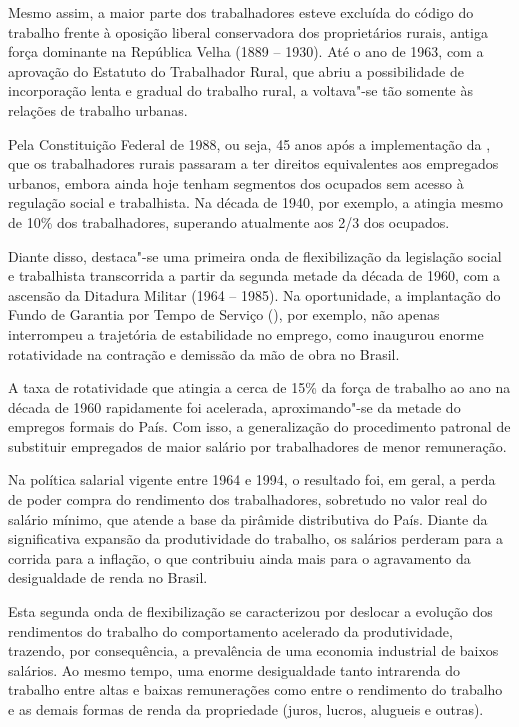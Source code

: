 Mesmo assim, a maior parte dos trabalhadores esteve excluída do código
do trabalho frente à oposição liberal conservadora dos proprietários
rurais, antiga força dominante na República Velha (1889 -- 1930). Até o
ano de 1963, com a aprovação do Estatuto do Trabalhador Rural, que abriu
a possibilidade de incorporação lenta e gradual do trabalho rural, a 
voltava"-se tão somente às relações de trabalho urbanas.

Pela Constituição Federal de 1988, ou seja, 45 anos após a implementação
da , que os trabalhadores rurais passaram a ter direitos equivalentes
aos empregados urbanos, embora ainda hoje tenham segmentos dos ocupados
sem acesso à regulação social e trabalhista. Na década de 1940, por
exemplo, a  atingia mesmo de 10\% dos trabalhadores, superando
atualmente aos 2/3 dos ocupados.

Diante disso, destaca"-se uma primeira onda de flexibilização da
legislação social e trabalhista transcorrida a partir da segunda metade
da década de 1960, com a ascensão da Ditadura Militar (1964 -- 1985). Na
oportunidade, a implantação do Fundo de Garantia por Tempo de Serviço
(), por exemplo, não apenas interrompeu a trajetória de estabilidade
no emprego, como inaugurou enorme rotatividade na contração e demissão
da mão de obra no Brasil.

A taxa de rotatividade que atingia a cerca de 15\% da força de trabalho
ao ano na década de 1960 rapidamente foi acelerada, aproximando"-se da
metade do empregos formais do País. Com isso, a generalização do
procedimento patronal de substituir empregados de maior salário por
trabalhadores de menor remuneração.

Na política salarial vigente entre 1964 e 1994, o resultado foi, em
geral, a perda de poder compra do rendimento dos trabalhadores,
sobretudo no valor real do salário mínimo, que atende a base da pirâmide
distributiva do País. Diante da significativa expansão da produtividade
do trabalho, os salários perderam para a corrida para a inflação, o que
contribuiu ainda mais para o agravamento da desigualdade de renda no
Brasil.

Esta segunda onda de flexibilização se caracterizou por deslocar a
evolução dos rendimentos do trabalho do comportamento acelerado da
produtividade, trazendo, por consequência, a prevalência de uma economia
industrial de baixos salários. Ao mesmo tempo, uma enorme desigualdade
tanto intrarenda do trabalho entre altas e baixas remunerações como
entre o rendimento do trabalho e as demais formas de renda da
propriedade (juros, lucros, alugueis e outras).

